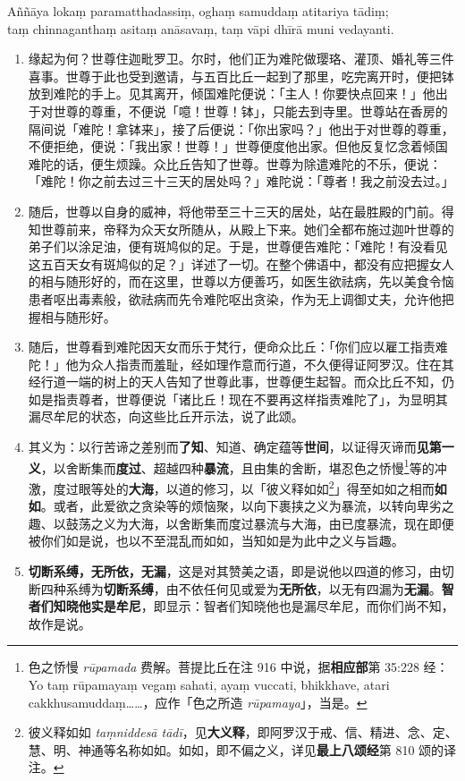 Aññāya lokaṃ paramatthadassiṃ, oghaṃ samuddaṃ atitariya tādiṃ;\\
taṃ chinnaganthaṃ asitaṃ anāsavaṃ, taṃ vāpi dhīrā muni vedayanti. %

\begin{enumerate}\item 缘起为何？世尊住迦毗罗卫。尔时，他们正为难陀做璎珞、灌顶、婚礼等三件喜事。世尊于此也受到邀请，与五百比丘一起到了那里，吃完离开时，便把钵放到难陀的手上。见其离开，倾国难陀便说：「主人！你要快点回来！」他出于对世尊的尊重，不便说「噫！世尊！钵」，只能去到寺里。世尊站在香房的隔间说「难陀！拿钵来」，接了后便说：「你出家吗？」他出于对世尊的尊重，不便拒绝，便说：「我出家！世尊！」世尊便度他出家。但他反复忆念着倾国难陀的话，便生烦躁。众比丘告知了世尊。世尊为除遣难陀的不乐，便说：「难陀！你之前去过三十三天的居处吗？」难陀说：「尊者！我之前没去过。」
\item 随后，世尊以自身的威神，将他带至三十三天的居处，站在最胜殿的门前。得知世尊前来，帝释为众天女所随从，从殿上下来。她们全都布施过迦叶世尊的弟子们以涂足油，便有斑鸠似的足。于是，世尊便告难陀：「难陀！有没看见这五百天女有斑鸠似的足？」详述了一切。在整个佛语中，都没有应把握女人的相与随形好的，而在这里，世尊以方便善巧，如医生欲祛病，先以美食令恼患者呕出毒素般，欲祛病而先令难陀呕出贪染，作为无上调御丈夫，允许他把握相与随形好。
\item 随后，世尊看到难陀因天女而乐于梵行，便命众比丘：「你们应以雇工指责难陀！」他为众人指责而羞耻，经如理作意而行道，不久便得证阿罗汉。住在其经行道一端的树上的天人告知了世尊此事，世尊便生起智。而众比丘不知，仍如是指责尊者，世尊便说「诸比丘！现在不要再这样指责难陀了」，为显明其漏尽牟尼的状态，向这些比丘开示法，说了此颂。
\item 其义为：以行苦谛之差别而\textbf{了知}、知道、确定蕴等\textbf{世间}，以证得灭谛而\textbf{见第一义}，以舍断集而\textbf{度过}、超越四种\textbf{暴流}，且由集的舍断，堪忍色之㤭慢\footnote{色之㤭慢 \textit{rūpamada} 费解。菩提比丘在注 916 中说，据\textbf{相应部}第 35:228 经：Yo taṃ rūpamayaṃ vegaṃ sahati, ayaṃ vuccati, bhikkhave, atari cakkhusamuddaṃ……，应作「色之所造 \textit{rūpamaya}」，当是。}等的冲激，度过眼等处的\textbf{大海}，以道的修习，以「彼义释如如\footnote{彼义释如如 \textit{taṃniddesā tādī}，见\textbf{大义释}，即阿罗汉于戒、信、精进、念、定、慧、明、神通等名称如如。如如，即不偏之义，详见\textbf{最上八颂经}第 810 颂的译注。}」得至如如之相而\textbf{如如}。或者，此爱欲之贪染等的烦恼聚，以向下裹挟之义为暴流，以转向卑劣之趣、以鼓荡之义为大海，以舍断集而度过暴流与大海，由已度暴流，现在即便被你们如是说，也以不至混乱而如如，当知如是为此中之义与旨趣。
\item \textbf{切断系缚，无所依，无漏}，这是对其赞美之语，即是说他以四道的修习，由切断四种系缚为\textbf{切断系缚}，由不依任何见或爱为\textbf{无所依}，以无有四漏为\textbf{无漏}。\textbf{智者们知晓他实是牟尼}，即显示：智者们知晓他也是漏尽牟尼，而你们尚不知，故作是说。\end{enumerate}

